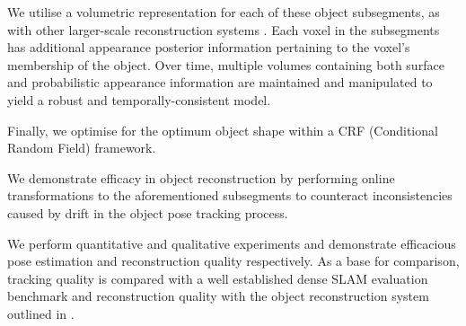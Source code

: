 We utilise a volumetric representation for each of these object subsegments, as with other larger-scale reconstruction
systems \cite{Kahler2016}. Each voxel in the subsegments has additional appearance posterior information pertaining to the voxel's membership 
of the object. Over time, multiple volumes containing both surface and probabilistic appearance information are maintained and manipulated to 
yield a robust and temporally-consistent model.

Finally, we optimise for the optimum object shape within a CRF (Conditional Random Field) framework.

We demonstrate efficacy in object reconstruction by performing online transformations to the aforementioned subsegments to counteract inconsistencies caused by drift in the object pose tracking process.

We perform quantitative and qualitative experiments and demonstrate efficacious pose estimation and reconstruction quality respectively. As a base 
for comparison, tracking quality is compared with a well established dense SLAM evaluation benchmark \cite{sturm12iros} and reconstruction quality 
with the object reconstruction system outlined in \cite{Ren2013}.

